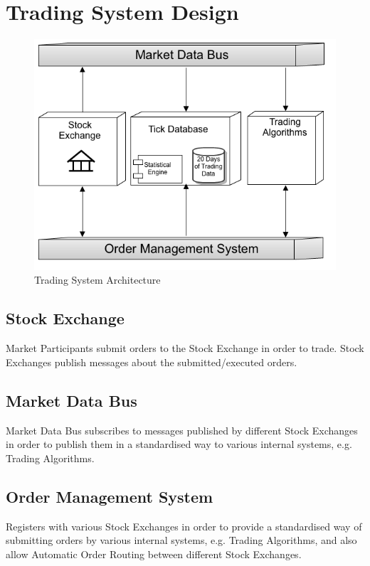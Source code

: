 \section{Trading System Design}

\begin{figure}[H]
\centerline{\includegraphics[scale=0.6]{architectural-description/trading-system-design.png}}
\caption{Trading System Architecture}
\label{fig:trading-system-architecture}
\end{figure}

\subsection{Stock Exchange}
Market Participants submit orders to the Stock Exchange in order to trade. Stock Exchanges publish messages about the submitted/executed orders.

\subsection{Market Data Bus}
Market Data Bus subscribes to messages published by different Stock Exchanges in order to publish them in a standardised way to various internal systems, e.g. Trading Algorithms.

\subsection{Order Management System}
Registers with various Stock Exchanges in order to provide a standardised way of submitting orders by various internal systems, e.g. Trading Algorithms, and also allow Automatic Order Routing between different Stock Exchanges.

